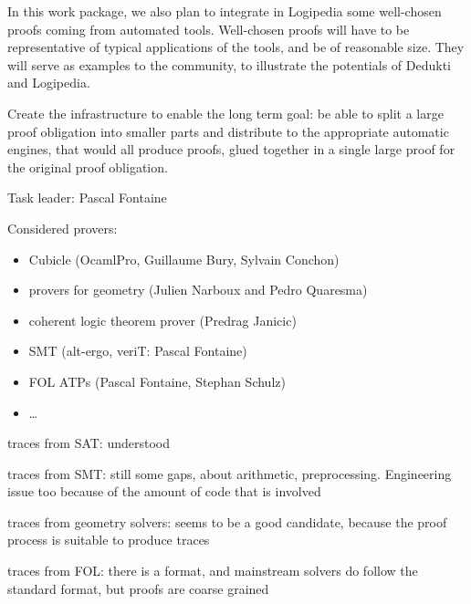 \begin{workpackage}[id=atpetc,wphases=0-48,type=RTD,
  short=ATPs etc.,%
  title={ATP, SAT, SMT, Model checkers},
  lead=Lie,
  LieRM=10]
\begin{wpdescription}
In this work package, we also plan to integrate in Logipedia some
well-chosen proofs coming from automated tools.  Well-chosen proofs
will have to be representative of typical applications of the tools,
and be of reasonable size.  They will serve as examples to the
community, to illustrate the potentials of Dedukti and Logipedia.


Create the infrastructure to enable the long term goal: be able to split a large proof
obligation into smaller parts and distribute to the appropriate automatic engines, that
would all produce proofs, glued together in a single large proof for the original proof
obligation.
\end{wpdescription}


\begin{tasklist}
\begin{task}[id=instrumenting, title=Instrumenting ATPs to produce
  traces]
  Task leader: Pascal Fontaine
  
Considered provers:
\begin{itemize}
\item Cubicle (OcamlPro, Guillaume Bury, Sylvain Conchon)
\item provers for geometry (Julien Narboux and Pedro Quaresma)
\item coherent logic theorem prover (Predrag Janicic)
\item SMT (alt-ergo, veriT: Pascal Fontaine)
\item FOL ATPs (Pascal Fontaine, Stephan Schulz)
\item \dots
\end{itemize}

traces from SAT: understood

traces from SMT: still some gaps, about arithmetic, preprocessing.  Engineering issue too because of the amount of code that is involved

traces from geometry solvers: seems to be a good candidate, because the proof process is suitable to produce traces

traces from FOL: there is a format, and mainstream solvers do follow the standard format, but proofs are coarse grained


\end{task}
\end{tasklist}
\end{workpackage}
